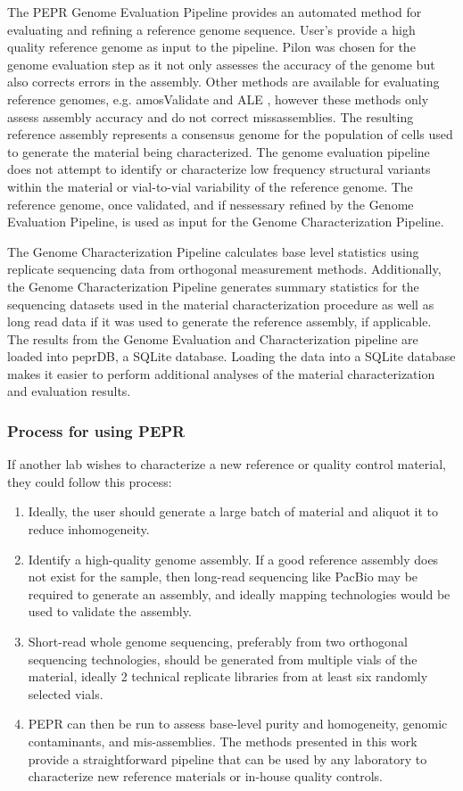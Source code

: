 \documentclass[smallextended]{svjour3}\usepackage[]{graphicx}\usepackage[]{color}
\begin{document}
The PEPR Genome Evaluation Pipeline provides an automated method for evaluating and refining a reference genome sequence. User's provide a high quality reference genome as input to the pipeline. Pilon was chosen for the genome evaluation step as it not only assesses the accuracy of the genome but also corrects errors in the assembly.  Other methods are available for evaluating reference genomes, e.g. amosValidate \cite{Phillippy2008} and ALE \cite{Clark2013}, however these methods only assess assembly accuracy and do not correct missassemblies. The resulting reference assembly represents a consensus genome for the population of cells used to generate the material being characterized.  The genome evaluation pipeline does not attempt to identify or characterize low frequency structural variants within the material or vial-to-vial variability of the reference genome. The reference genome, once validated, and if nessessary refined by the Genome Evaluation Pipeline, is used as input for the Genome Characterization Pipeline. 

The Genome Characterization Pipeline calculates base level statistics using replicate sequencing data from orthogonal measurement methods.  Additionally, the Genome Characterization Pipeline generates summary statistics for the sequencing datasets used in the material characterization procedure as well as long read data if it was used to generate the reference assembly, if applicable.  The results from the Genome Evaluation and Characterization pipeline are loaded into peprDB, a SQLite database. Loading the data into a SQLite database makes it easier to perform additional analyses of the material characterization and evaluation results.

\subsubsection{Process for using PEPR}
If another lab wishes to characterize a new reference or quality control material, they could follow this process:
\begin{enumerate}
    \item Ideally, the user should generate a large batch of material and aliquot it to reduce inhomogeneity.
    \item Identify a high-quality genome assembly. If a good reference assembly does not exist for the sample, then long-read sequencing like PacBio may be required to generate an assembly, and ideally mapping technologies would be used to validate the assembly.
    \item Short-read whole genome sequencing, preferably from two orthogonal sequencing technologies, should be generated from multiple vials of the material, ideally 2 technical replicate libraries from at least six randomly selected vials.
    \item PEPR can then be run to assess base-level purity and homogeneity, genomic contaminants, and mis-assemblies.
The methods presented in this work provide a straightforward pipeline that can be used by any laboratory to characterize new reference materials or in-house quality controls.
\end{enumerate}
\end{document}
